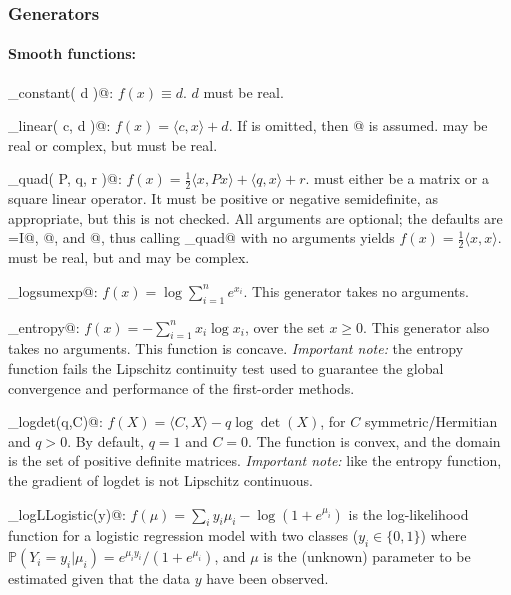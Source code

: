 \documentclass{article}
\newcommand\thalf{{\textstyle\frac{1}{2}}}
\newcommand{\<}{\langle}
\renewcommand{\>}{\rangle}
\begin{document}
\subsubsection{Generators}
\label{sec:smoothg}

\paragraph{Smooth functions:}
\begin{trivlist}
\item \verb@smooth_constant( d )@: $f(x)\equiv d$. $d$ must be real.
\item \verb@smooth_linear( c, d )@: $f(x)=\<c,x\>+d$. If \verb@d@
is omitted, then @ is assumed. \verb@c@ may be real or complex,
but \verb@d@ must be real.
\item \verb@smooth_quad( P, q, r )@: $f(x)=\thalf \<x,Px\>+\<q,x\>+r$. 
\verb@P@ must either be a matrix or a square linear operator. It must
be  positive or negative semidefinite, as appropriate, but this is not checked.
All arguments are optional; the defaults are \verb@P=I@, @, and @, thus
calling \verb@smooth_quad@ with no arguments yields $f(x)=\thalf\<x,x\>$.
\verb@r@ must be real, but \verb@P@ and \verb@q@ may be complex.
\item \verb@smooth_logsumexp@: $f(x)=\log\sum_{i=1}^n e^{x_i}$. This generator
takes no arguments.
\item \verb@smooth_entropy@: $f(x)=-\sum_{i=1}^n x_i\log x_i$, over the set $x \ge 0$. This generator
also takes no arguments. This function is concave. \emph{Important note:} the entropy
function fails the Lipschitz continuity test used to guarantee the global convergence and 
performance of the first-order methods.
\item \verb@smooth_logdet(q,C)@: $f(X) = \<C,X\> - q \log \det(X) $, for $C$ symmetric/Hermitian
    and $q > 0$. By default, $q=1$ and $C=0$. The function is convex, and the domain
    is the set of positive definite matrices.  \emph{Important note:} like the entropy function,
    the gradient of logdet is not Lipschitz continuous.
\item \verb@smooth_logLLogistic(y)@: $f(\mu) = \sum_i y_i \mu_i - \log( 1+e^{\mu_i} )$
    is the log-likelihood function for a logistic regression model with two classes ($y_i \in \{0,1\}$)
    where $\mathbb{P}(Y_i=y_i|\mu_i) = e^{\mu_i y_i}/( 1 + e^{\mu_i} )$, and $\mu$ is the (unknown) parameter
    to be estimated given that the data $y$ have been observed.

\end{trivlist}
\end{document}
